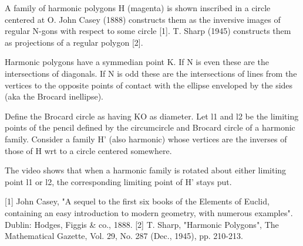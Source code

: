 A family of harmonic polygons H (magenta) is shown inscribed in a circle centered at O. John Casey (1888) constructs them as the inversive images of regular N-gons with respect to some circle [1]. T. Sharp (1945) constructs them as projections of a regular polygon [2].

Harmonic polygons have a symmedian point K. If N is even these are the intersections of diagonals. If N is odd these are the intersections of lines from the vertices to the opposite points of contact with the ellipse enveloped by the sides (aka the Brocard inellipse).

Define the Brocard circle as having KO as diameter. Let l1 and l2 be the limiting points of the pencil defined by the circumcircle and Brocard circle of a harmonic family. Consider a family H' (also harmonic) whose vertices are the inverses of those of H wrt to a circle centered somewhere.

The video shows that when a harmonic family is rotated about either limiting point l1 or l2, the corresponding limiting point of H' stays put.

[1] John Casey, "A sequel to the first six books of the Elements of Euclid, containing an easy introduction to modern geometry, with numerous examples". Dublin: Hodges, Figgis & co., 1888.
[2] T. Sharp, "Harmonic Polygons", The Mathematical Gazette, Vol. 29, No. 287 (Dec., 1945), pp. 210-213.